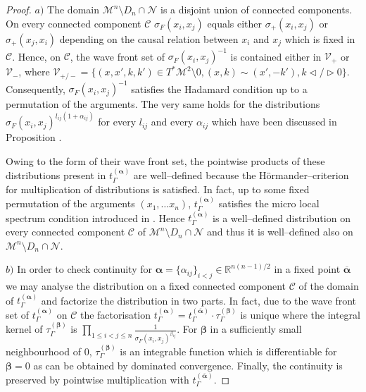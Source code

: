 \documentclass[11pt]{book}
\newcommand{\alphabd}{\boldsymbol{\alpha}}
\newcommand{\betabd}{\boldsymbol{\beta}}
\newcommand{\Mcal}{\mathcal{M}}
\newcommand{\Ncal}{\mathcal{N}}
\theoremstyle{break}
\begin{document}
\begin{proof}








$a)$ The domain $\Mcal^n\setminus D_n\cap \Ncal$ is a disjoint union of connected components. On every connected component $\mathcal{C}$ $\sigma_F(x_i,x_j)$ equals either $\sigma_+(x_i,x_j)$ or $\sigma_+(x_j,x_i)$ depending on the causal relation between $x_i$ and $x_j$ which is fixed in $\mathcal{C}$.
Hence, on $\mathcal{C}$, the wave front set of $\sigma_F(x_i,x_j)^{-1}$ is contained either in $\mathcal{V}_+$ or $\mathcal{V}_-$, where $\mathcal{V}_{+/-} = \{(x,x',k,k') \in T^*\Mcal^2\setminus 0, (x,k)\sim (x',-k'),  k \triangleleft / \triangleright 0  \}$. Consequently, $\sigma_F(x_i,x_j)^{-1}$ satisfies the Hadamard condition up to a permutation of the arguments. The very same holds for the distributions $\sigma_F(x_i,x_j)^{l_{ij}(1+\alpha_{ij})}$ for every $l_{ij}$ and every $\alpha_{ij}$ which have been discussed in Proposition %
.

Owing to the form of their wave front set, the pointwise products of these distributions present in $t_\Gamma^{(\alphabd)}$ are well--defined because the H\"ormander--criterion for multiplication of distributions is satisfied. In fact, up to some fixed permutation of the arguments $(x_1,\dots x_n)$, $t_\Gamma^{(\alphabd)}$ satisfies the micro local spectrum condition introduced in %
. 
Hence $t_\Gamma^{(\alphabd)}$ is a well--defined distribution on every connected component $\mathcal{C}$ of $\Mcal^n\setminus D_n\cap \Ncal$ and thus it is well--defined also on $\Mcal^n\setminus D_n\cap \Ncal$. 

\bigskip

$b)$ 
In order to check continuity for $\alphabd= \{\alpha_{ij}\}_{i<j}\in \mathbb{R}^{n(n-1)/2}$ in a fixed point $\overline{\alphabd}$ we may analyse the distribution on a fixed connected component $\mathcal{C}$ of the domain of $t_\Gamma^{(\alphabd)}$ and factorize the distribution in two parts. 
In fact, due to the wave front set of $t_\Gamma^{(\alphabd)}$ on $\mathcal{C}$ the factorisation $t_\Gamma^{(\alphabd)} =t_\Gamma^{(\overline{\alphabd})} \cdot \tau_\Gamma^{(\betabd)}$ is unique where the integral kernel of $\tau_\Gamma^{(\betabd)}$ is $\prod_{1\leq i < j \leq n } \frac{1}{\sigma_F(x_i,x_j)^{\beta_{ij}}}$.
For $\betabd$ in a sufficiently small neighbourhood of $0$, $\tau_\Gamma^{(\betabd)}$ is an integrable function which is differentiable for $\betabd=0$ as can be obtained by dominated convergence. Finally, the continuity is preserved by pointwise multiplication with $t_\Gamma^{(\overline{\alphabd})}$.



\end{proof}
\end{document}
